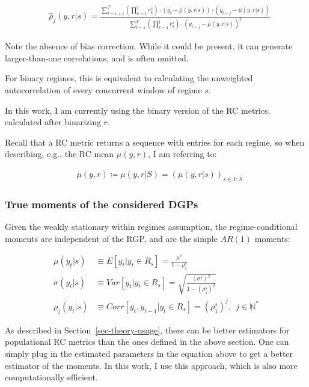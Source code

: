 \documentclass[
  letterpaper,
  DIV=11,
  numbers=noendperiod]{scrartcl}
\numberwithin{equation}{section}
\numberwithin{table}{section}
\numberwithin{figure}{section}
\begin{document}
\begin{align}
    &\hat{\rho}_j(y, r | s) = \frac{\sum_{t = 1 + j}^T \left(\prod_{k = 1}^j r^s_k\right) \cdot (y_t - \hat{\mu}(y, r | s)) \cdot (y_{t-j} - \hat{\mu}(y, r | s))}{\sum_{t = 1}^T \left(\prod_{k = 1}^j r^s_k\right) \cdot (y_{t-j} - \hat{\mu}(y, r | s))^2}
\end{align}

Note the absence of bias correction. While it could be present, it can
generate larger-than-one correlations, and is often omitted.

For binary regimes, this is equivalent to calculating the unweighted
autocorrelation of every concurrent window of regime \(s\).

In this work, I am currently using the binary version of the RC metrics,
calculated after binarizing \(r\).

Recall that a RC metric returns a sequence with entries for each regime,
so when describing, e.g., the RC mean \(\mu(y, r)\), I am referring to:

\begin{align}
    &\mu(y, r) \coloneqq \mu(y, r | S) = \left(\mu(y, r | s)\right)_{s \in 1:S}
\end{align}

\subsubsection{True moments of the considered
DGPs}\label{true-moments-of-the-considered-dgps}

Given the weakly stationary within regimes assumption, the
regime-conditional moments are independent of the RGP, and are the
simple \(AR(1)\) moments:

\begin{equation}
\begin{array}{ll}
    \mu(y_t | s) &\equiv E[y_t | y_t \in R_s] = \frac{\mu^s}{1 - \rho^s_1}\\
    \sigma(y_t | s) &\equiv Var[y_t | y_t \in R_s] = \sqrt{\frac{(\sigma^s)^2}{1 - (\rho^s_1)^2}}\\
    \rho_j(y_t | s) &\equiv Corr[y_t, y_{t-1} | y_t \in R_s] = (\rho^s_1)^j, ~~ j \in \mathbb{N}^*
\end{array}
\end{equation}

As described in Section~\ref{sec-theory-usage}, there can be better
estimators for populational RC metrics than the ones defined in the
above section. One can simply plug in the estimated parameters in the
equation above to get a better estimator of the moments. In this work, I
use this approach, which is also more computationally efficient.
\end{document}

